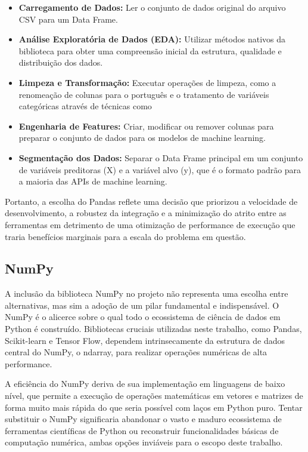 \begin{itemize}
    \item \textbf{Carregamento de Dados:} Ler o conjunto de dados original do arquivo CSV para um Data Frame.
    \item \textbf{Análise Exploratória de Dados (EDA):} Utilizar métodos nativos da biblioteca para obter uma compreensão inicial da estrutura, qualidade e distribuição dos dados.
    \item \textbf{Limpeza e Transformação:} Executar operações de limpeza, como a renomeação de colunas para o português e o tratamento de variáveis categóricas através de técnicas como
    \item \textbf{Engenharia de Features:} Criar, modificar ou remover colunas para preparar o conjunto de dados para os modelos de machine learning.
    \item \textbf{Segmentação dos Dados:} Separar o Data Frame principal em um conjunto de variáveis preditoras (X) e a variável alvo (y), que é o formato padrão para a maioria das APIs de machine learning.
\end{itemize}

Portanto, a escolha do Pandas reflete uma decisão que priorizou a velocidade de desenvolvimento, a robustez da integração e a minimização do atrito entre as ferramentas em detrimento de uma otimização de performance de execução que traria benefícios marginais para a escala do problema em questão.

\subsection{NumPy}
A inclusão da biblioteca NumPy no projeto não representa uma escolha entre alternativas, mas sim a adoção de um pilar fundamental e indispensável. O NumPy é o alicerce sobre o qual todo o ecossistema de ciência de dados em Python é construído. Bibliotecas cruciais utilizadas neste trabalho, como Pandas, Scikit-learn e Tensor Flow, dependem intrinsecamente da estrutura de dados central do NumPy, o ndarray, para realizar operações numéricas de alta performance.

A eficiência do NumPy deriva de sua implementação em linguagens de baixo nível, que permite a execução de operações matemáticas em vetores e matrizes de forma muito mais rápida do que seria possível com laços em Python puro. Tentar substituir o NumPy significaria abandonar o vasto e maduro ecossistema de ferramentas científicas de Python ou reconstruir funcionalidades básicas de computação numérica, ambas opções inviáveis para o escopo deste trabalho.

